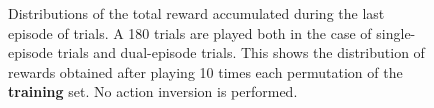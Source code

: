 \begin{figure}
	\centering
	\caption{Distributions of the total reward accumulated during the last
	episode of trials. A 180 trials are played both in the case of
	single-episode trials and dual-episode trials. This shows the
	distribution of rewards obtained after playing 10 times each
	permutation of the \textbf{training} set. No action inversion is performed.}
	\label{fig:20perms_distrib}
\end{figure}

